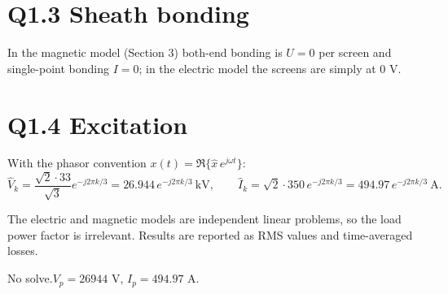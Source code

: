 \section*{Q1.3 Sheath bonding}
\assignmentquestion{\QuestionOneThree}
\answer{\AnsOneThree}
In the magnetic model (Section 3) both-end bonding is \(U=0\) per screen and single-point bonding
\(I=0\); in the electric model the screens are simply at 0 V.
\begin{center}
\end{center}

\section*{Q1.4 Excitation}
\assignmentquestion{\QuestionOneFour}
\answer{\AnsOneFour}
With the phasor convention \(x(t)=\Re\{\hat x\,e^{j\omega t}\}\):
\[
 \hat V_k=\frac{\sqrt2\cdot33}{\sqrt3}e^{-j2\pi k/3}=26.944\,e^{-j2\pi k/3}\ \mathrm{kV},\qquad
 \hat I_k=\sqrt2\cdot350\,e^{-j2\pi k/3}=494.97\,e^{-j2\pi k/3}\ \mathrm{A}.
\]
\begin{center}
\end{center}
The electric and magnetic models are independent linear problems, so the load power factor is
irrelevant. Results are reported as RMS values and time-averaged losses.

{No solve.}{\(V_p=26944\) V, \(I_p=494.97\) A.}


